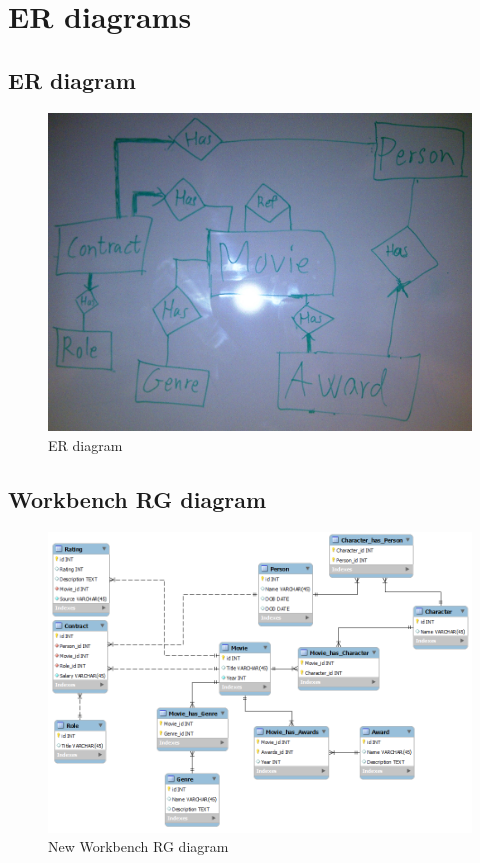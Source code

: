 \section{ER diagrams}
\subsection{ER diagram}
\begin{figure}[h!]
\includegraphics[width=\textwidth,natwidth=2005,natheight=1506]{illustrations/ER.jpg}
  \caption{ER diagram}
\end{figure}
\subsection{Workbench RG diagram}
\begin{figure}[h!]
\includegraphics[width=\textwidth,natwidth=940,natheight=670]{illustrations/RG.png}
  \caption{New Workbench RG diagram}
\end{figure}
\newpage
